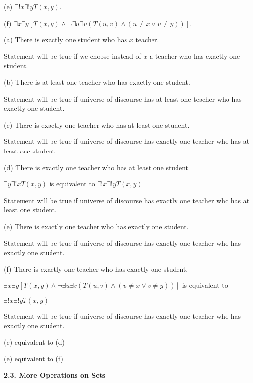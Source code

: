\documentclass{article}
\begin{document}
\hspace{12pt}(e) $\exists ! x \exists ! y T(x, y)$.

\hspace{12pt}(f) $\exists x \exists y [T (x, y) \land \neg \exists u \exists v (T(u, v) \land (u \neq  x \lor v \neq y))]$.
\vspace{20pt}

(a) There is exactly one student who has $x$ teacher.

Statement will be true if we choose instead of $x$ a teacher who has exactly one student.
\vspace{20pt}

(b) There is at least one teacher who has exactly one student.

Statement will be true if universe of discourse has at least one teacher who has exactly one student.
\vspace{20pt}

(c) There is exactly one teacher who has at least one student.

Statement will be true if universe of discourse has exactly one teacher who has at least one student.
\vspace{20pt}

(d) There is exactly one teacher who has at least one student

$\exists y \exists ! x T(x, y)$ is equivalent to $\exists ! x \exists ! y T(x, y)$

Statement will be true if universe of discourse has exactly one teacher who has at least one student.
\vspace{20pt}

(e) There is exactly one teacher who has exactly one student.

Statement will be true if universe of discourse has exactly one teacher who has exactly one student.
\vspace{20pt}

(f) There is exactly one teacher who has exactly one student.

$\exists x \exists y [T (x, y) \land \neg \exists u \exists v (T(u, v) \land (u \neq  x \lor v \neq y))]$ is equivalent to

$\exists ! x \exists ! y T(x, y)$

Statement will be true if universe of discourse has exactly one teacher who has exactly one student.
\vspace{20pt}


(c) equivalent to (d)

(e) equivalent to (f)

\vspace{50pt}


\textbf{2.3. More Operations on Sets}
\end{document}
